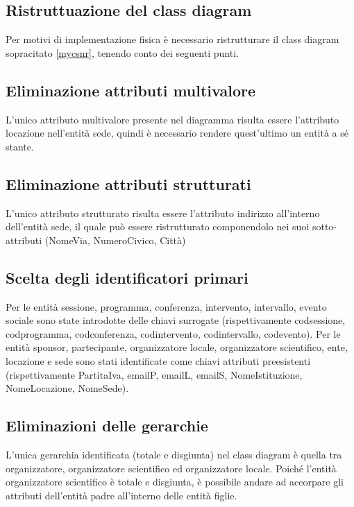 \documentclass[a4page]{article}
\begin{document}
\subsection{Ristruttuazione del class diagram}
Per motivi di implementazione fisica è necessario ristrutturare il class diagram sopracitato \ref{mycsnr}, tenendo conto dei seguenti punti.
\subsection{Eliminazione attributi multivalore}
L'unico attributo multivalore presente nel diagramma risulta essere l'attributo locazione nell'entità sede, quindi è necessario rendere quest'ultimo un entità a sé stante. 
\subsection{Eliminazione attributi strutturati}
L'unico attributo strutturato risulta essere l'attributo indirizzo all'interno dell'entità sede, il quale può essere ristrutturato componendolo nei suoi sotto-attributi (NomeVia, NumeroCivico, Città)
\subsection{Scelta degli identificatori primari}
Per le entità sessione, programma, conferenza, intervento, intervallo, evento sociale sono state introdotte delle chiavi surrogate (rispettivamente codsessione, codprogramma, codconferenza, codintervento, codintervallo, codevento). \vspace{1cm}\newline
Per le entità sponsor, partecipante, organizzatore locale, organizzatore scientifico, ente, locazione e sede sono stati identificate come chiavi attributi preesistenti (rispettivamente PartitaIva, emailP, emailL, emailS, NomeIstituzione, NomeLocazione, NomeSede).
\subsection{Eliminazioni delle gerarchie}
L'unica gerarchia identificata (totale e disgiunta) nel class diagram è quella tra organizzatore, organizzatore scientifico ed organizzatore locale. Poiché l'entità organizzatore scientifico è totale e disgiunta, è possibile andare ad accorpare gli attributi dell'entità padre all'interno delle entità figlie.
\end{document}
